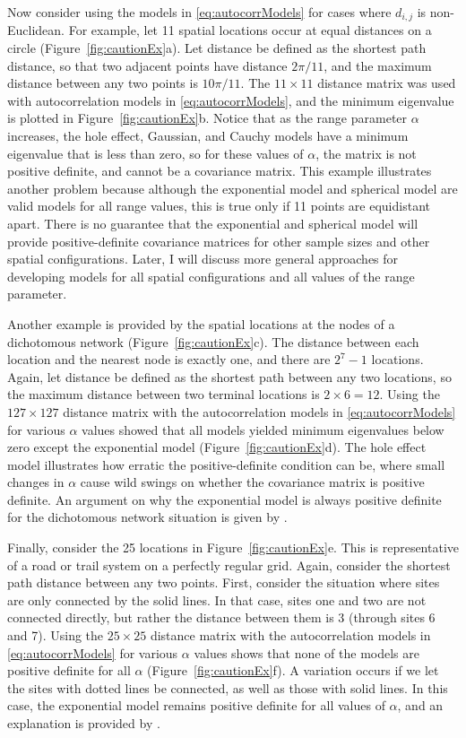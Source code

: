 Now consider using the models in \ref{eq:autocorrModels} for cases where $d_{i,j}$ is non-Euclidean.  For example, let 11 spatial locations occur at equal distances on a circle (Figure~\ref{fig:cautionEx}a).  Let distance be defined as the shortest path distance, so that two adjacent points have distance $2\pi/11$, and the maximum distance between any two points is $10\pi/11$.  The $11 \times 11$ distance matrix was used with autocorrelation models in \ref{eq:autocorrModels}, and the minimum eigenvalue is plotted in Figure~\ref{fig:cautionEx}b.  Notice that as the range parameter $\alpha$ increases, the hole effect, Gaussian, and Cauchy models have a minimum eigenvalue that is less than zero, so for these values of $\alpha$, the matrix is not positive definite, and cannot be a covariance matrix. This example illustrates another problem because although the exponential model and spherical model are valid models for all range values, this is true only if 11
points are equidistant apart. There is no guarantee that the exponential and spherical model will provide positive-definite covariance matrices for other sample sizes and other spatial configurations.  Later, I will discuss more general approaches for developing models for all spatial configurations and all values of the range parameter.

Another example is provided by the spatial locations at the nodes of a dichotomous network (Figure~\ref{fig:cautionEx}c). The distance between each location and the nearest node is exactly one, and there are $2^7 - 1$ locations.  Again, let distance be defined as the shortest path between any two locations, so the maximum distance between two terminal locations is $2 \times 6 = 12$.  Using the $127 \times 127$ distance matrix with the autocorrelation models in \ref{eq:autocorrModels} for various $\alpha$ values showed that all models yielded minimum eigenvalues below zero except the exponential model (Figure~\ref{fig:cautionEx}d).  The hole effect model illustrates how erratic the positive-definite condition can be, where small changes in $\alpha$ cause wild swings on whether the covariance matrix is positive definite. An argument on why the exponential model is always positive definite for the dichotomous network situation is given by \citet{Ver:Pete:Move:2010}.

Finally, consider the 25 locations in Figure~\ref{fig:cautionEx}e.  This is representative of a road or trail system on a perfectly regular grid.  Again, consider the shortest path distance between any two points.  First, consider the situation where sites are only connected by the solid lines.  In that case, sites one and two are not connected directly, but rather the distance between them is 3 (through sites 6 and 7).  Using the $25 \times 25$ distance matrix with the autocorrelation models in \ref{eq:autocorrModels} for various $\alpha$ values shows that none of the models are positive definite for all $\alpha$ (Figure~\ref{fig:cautionEx}f). A variation occurs if we let the sites with dotted lines be connected, as well as those with solid lines.  In this case, the exponential model remains positive definite for all values of $\alpha$, and an explanation is provided by \citet{Curr:NonE:2006}.

